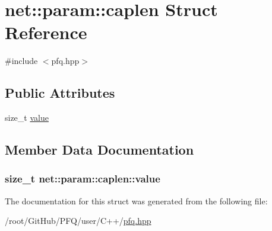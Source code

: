 \hypertarget{structnet_1_1param_1_1caplen}{\section{net\-:\-:param\-:\-:caplen Struct Reference}
\label{structnet_1_1param_1_1caplen}
}


{\ttfamily \#include $<$pfq.\-hpp$>$}

\subsection*{Public Attributes}
\begin{DoxyCompactItemize}
\item 
size\-\_\-t \hyperlink{structnet_1_1param_1_1caplen_a48064660e860d24789528b4651528d58}{value}
\end{DoxyCompactItemize}


\subsection{Member Data Documentation}
\hypertarget{structnet_1_1param_1_1caplen_a48064660e860d24789528b4651528d58}{
\subsubsection[{value}]{\setlength{\rightskip}{0pt plus 5cm}size\-\_\-t net\-::param\-::caplen\-::value}}\label{structnet_1_1param_1_1caplen_a48064660e860d24789528b4651528d58}


The documentation for this struct was generated from the following file\-:\begin{DoxyCompactItemize}
\item 
/root/\-Git\-Hub/\-P\-F\-Q/user/\-C++/\hyperlink{pfq_8hpp}{pfq.\-hpp}\end{DoxyCompactItemize}
